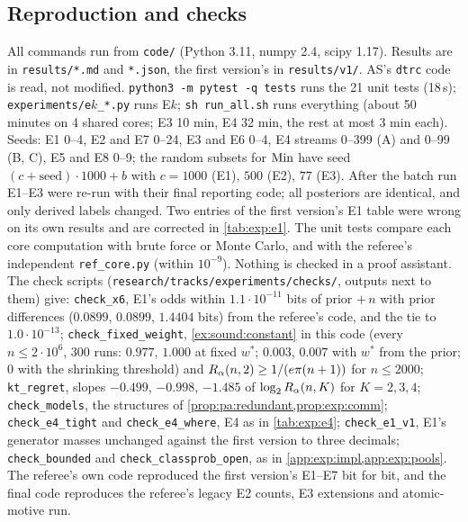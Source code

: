 \subsection{Reproduction and checks}\label{app:exp:repro}

All commands run from \texttt{code/} (Python 3.11, numpy 2.4, scipy 1.17). Results are in \texttt{results/*.md} and \texttt{*.json}, the first version's in \texttt{results/v1/}. AS's \texttt{dtrc} code is read, not modified. \texttt{python3 -m pytest -q tests} runs the 21 unit tests (18\,s); \texttt{experiments/e}$k$\texttt{\_*.py} runs E$k$; \texttt{sh run\_all.sh} runs everything (about 50 minutes on 4 shared cores; E3 10 min, E4 32 min, the rest at most 3 min each). Seeds: E1 0--4, E2 and E7 0--24, E3 and E6 0--4, E4 streams 0--399 (A) and 0--99 (B, C), E5 and E8 0--9; the random subsets for $\mathrm{Min}$ have seed $(c+\text{seed})\cdot1000+b$ with $c=1000$ (E1), $500$ (E2), $77$ (E3). After the batch run E1--E3 were re-run with their final reporting code; all posteriors are identical, and only derived labels changed. Two \Lzero{} entries of the first version's E1 table were wrong on its own results and are corrected in \cref{tab:exp:e1}. The unit tests compare each core computation with brute force or Monte Carlo, and with the referee's independent \texttt{ref\_core.py} (within $10^{-9}$). Nothing is checked in a proof assistant. The check scripts (\texttt{research/tracks/experiments/checks/}, outputs next to them) give: \texttt{check\_x6}, E1's \Lone{} odds within $1.1\cdot10^{-11}$ bits of prior $+\,n$ with prior differences ($0.0899$, $0.0899$, $1.4404$ bits) from the referee's code, and the \Lselc{} tie to $1.0\cdot10^{-13}$; \texttt{check\_fixed\_weight}, \cref{ex:sound:constant} in this code (every $n\le2\cdot10^6$, 300 runs: $0.977$, $1.000$ at fixed $w^*$; $0.003$, $0.007$ with $w^*$ from the prior; $0$ with the shrinking threshold) and $R_{\alpha}(n,2)\ge1/(e\pi(n+1))$ for $n\le2000$; \texttt{kt\_regret}, slopes $-0.499$, $-0.998$, $-1.485$ of $\log_2R_{\alpha}(n,K)$ for $K=2,3,4$; \texttt{check\_models}, the structures of \cref{prop:pa:redundant,prop:exp:comm}; \texttt{check\_e4\_tight} and \texttt{check\_e4\_where}, E4 as in \cref{tab:exp:e4}; \texttt{check\_e1\_v1}, E1's generator masses unchanged against the first version to three decimals; \texttt{check\_bounded} and \texttt{check\_classprob\_open}, as in \cref{app:exp:impl,app:exp:pools}. The referee's own code reproduced the first version's E1--E7 bit for bit, and the final code reproduces the referee's legacy E2 counts, E3 extensions and atomic-motive run.

